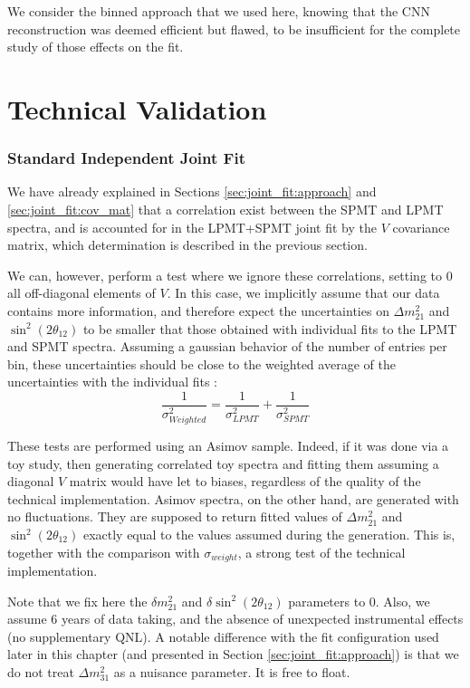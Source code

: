 \documentclass[../main.tex]{subfiles}
\begin{document}
We consider the binned approach that we used here, knowing that the CNN reconstruction was deemed efficient but flawed, to be insufficient for the complete study of those effects on the fit.



\section{Technical Validation}
\label{sec:joint_fit:validation}

\subsubsection{Standard Independent Joint Fit}


We have already explained in Sections \ref{sec:joint_fit:approach} and \ref{sec:joint_fit:cov_mat} that a correlation exist between the SPMT and LPMT spectra, and is accounted for in the LPMT+SPMT joint fit by the $V$ covariance matrix, which determination is described in the previous section.

We can, however, perform a test where we ignore these correlations, setting to 0 all off-diagonal elements of $V$. In this case, we implicitly assume that our data contains more information, and therefore expect the uncertainties on $\Delta m^2_{21}$ and $\sin^2(2 \theta_{12})$ to be smaller that those obtained with individual fits to the LPMT and SPMT spectra. Assuming a gaussian behavior of the number of entries per bin, these uncertainties should be close to the weighted average of the uncertainties with the individual fits :
\begin{equation}
  \label{eq:joint_fit:weighted_average}
  \frac{1}{\sigma^2_{Weighted}} = \frac{1}{\sigma^2_{LPMT}} + \frac{1}{\sigma^2_{SPMT}}
\end{equation}

These tests are performed using an Asimov sample. Indeed, if it was done via a toy study, then generating correlated toy spectra and fitting them assuming a diagonal $V$ matrix would have let to biases, regardless of the quality of the technical implementation. Asimov spectra, on the other hand, are generated with no fluctuations. They are supposed to return fitted values of $\Delta m^2_{21}$ and $\sin^2(2 \theta_{12})$ exactly equal to the values assumed during the generation. This is, together with the comparison with $\sigma_{weight}$, a strong test of the technical implementation.

Note that we fix here the $\delta m^2_{21}$ and $\delta \sin^2(2 \theta_{12})$ parameters to 0. Also, we assume 6 years of data taking, and the absence of unexpected instrumental effects (no supplementary QNL). A notable difference with the fit configuration used later in this chapter (and presented in Section \ref{sec:joint_fit:approach}) is that we do not treat $\Delta m^2_{31}$ as a nuisance parameter. It is free to float.
\end{document}
